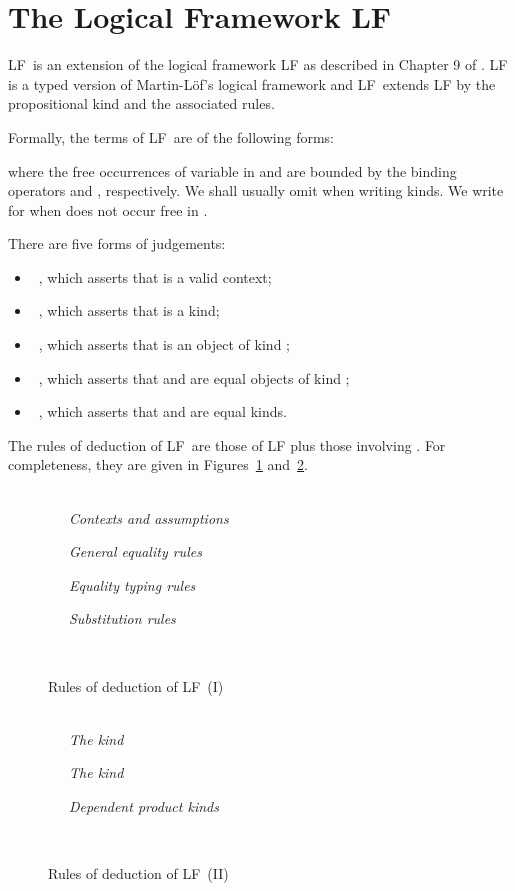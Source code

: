 \documentclass[acmtocl]{acmtrans2m}
\newcommand{\LF}{LF}
\begin{document}
\appendix
\section{The Logical Framework \LF}
\label{appendix:lf}

\LF\ is an extension of the logical framework LF as described in
Chapter 9 of \cite{luo:car}.  LF is a typed version of
Martin-L\"{o}f's logical framework and \LF\ extends LF by the
propositional kind  and the associated rules.

Formally, the terms of \LF\ are of the following forms:

where the free occurrences of variable  in  and  are
bounded by the binding operators  and , respectively.  We shall usually omit  when writing kinds.  We write  for  when  does not occur free in .
\pagebreak

There are five forms of judgements:
\begin{itemize}
\item \ , which asserts that  is a valid context;
\item
\ , which asserts that  is a kind;
\item
\ , which asserts that  is an object
of kind ;
\item
\ , which asserts that  and 
are equal objects of kind ;
\item
\ , which asserts that  and  are equal
kinds.
\end{itemize}
The rules of deduction of \LF\ are those of LF \cite{luo:car} plus
those involving .  For completeness, they are given in
Figures~\ref{LF-rulesGen} and~\ref{LF-rulesSpec}.


\begin{figure}\begin{minipage}{\linewidth}
\ \\

\ \ \ \emph{Contexts and assumptions}


\ \ \ \emph{General equality rules}



\ \ \ \emph{Equality typing rules}


\ \ \ \emph{Substitution rules}





\
\end{minipage}
\caption{Rules of deduction of \LF\ (I)} \label{LF-rulesGen}
\end{figure}


\begin{figure}\begin{minipage}{\linewidth}
\ \\

\ \ \ \emph{The kind }


\ \ \ \emph{The kind }


\ \ \ \emph{Dependent product kinds}




\\
\end{minipage}
\caption{Rules of deduction of \LF\ (II)} \label{LF-rulesSpec}
\end{figure}
\end{document}
